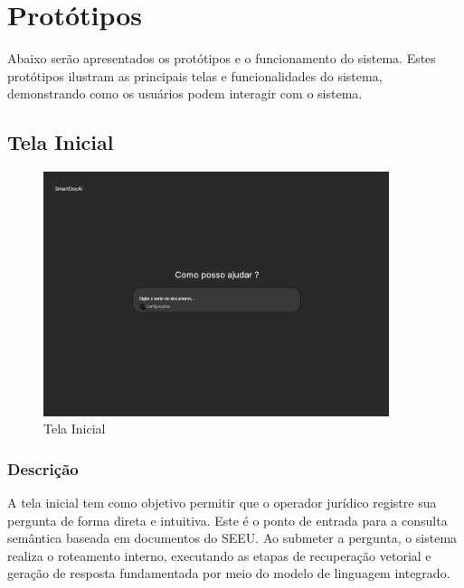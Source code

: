 \section{Protótipos}
\label{sec:prototipos}
\noindent Abaixo serão apresentados os protótipos e o funcionamento do sistema. Estes protótipos ilustram as principais telas e funcionalidades do sistema, demonstrando como os usuários podem interagir com o sistema.


\subsection{Tela Inicial}
\label{subsec:tela_inicial}

\begin{figure}[H]
  \centering
  \includegraphics[width=0.9\textwidth]{04-figuras/inicio.png}
  \caption{Tela Inicial}
  \label{fig:tela-inical}
\end{figure}


\subsubsection{Descrição}

A tela inicial tem como objetivo permitir que o operador jurídico registre sua pergunta de forma direta e intuitiva. Este é o ponto de entrada para a consulta semântica baseada em documentos do SEEU. Ao submeter a pergunta, o sistema realiza o roteamento interno, executando as etapas de recuperação vetorial e geração de resposta fundamentada por meio do modelo de linguagem integrado.

